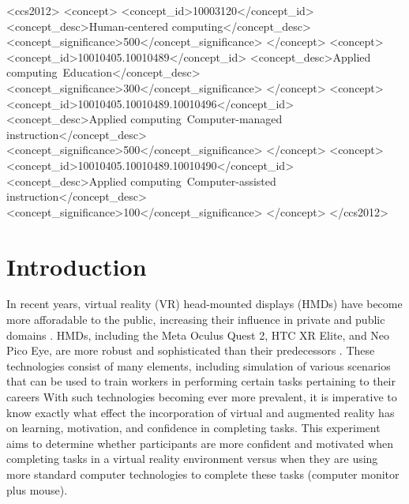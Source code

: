 \documentclass[manuscript,screen,review]{acmart}
\begin{document}
\begin{CCSXML}
<ccs2012>
   <concept>
       <concept_id>10003120</concept_id>
       <concept_desc>Human-centered computing</concept_desc>
       <concept_significance>500</concept_significance>
       </concept>
   <concept>
       <concept_id>10010405.10010489</concept_id>
       <concept_desc>Applied computing~Education</concept_desc>
       <concept_significance>300</concept_significance>
       </concept>
   <concept>
       <concept_id>10010405.10010489.10010496</concept_id>
       <concept_desc>Applied computing~Computer-managed instruction</concept_desc>
       <concept_significance>500</concept_significance>
       </concept>
   <concept>
       <concept_id>10010405.10010489.10010490</concept_id>
       <concept_desc>Applied computing~Computer-assisted instruction</concept_desc>
       <concept_significance>100</concept_significance>
       </concept>
 </ccs2012>
\end{CCSXML}




\maketitle

\section{Introduction}
In recent years, virtual reality (VR) head-mounted displays (HMDs) have become more afforadable to the public, increasing their influence in private and public domains \cite{gugenheimer2019challenges}. HMDs, including the Meta Oculus Quest 2, HTC XR Elite, and Neo Pico Eye, are more robust and sophisticated than their predecessors \cite{mehrfard2019comparative}. These technologies consist of many elements, including simulation of various scenarios that can be used to train workers in performing certain tasks pertaining to their careers \cite{zheng1998virtual} With such technologies becoming ever more prevalent, it is imperative to know exactly what effect the incorporation of virtual and augmented reality has on learning, motivation, and confidence in completing tasks. This experiment aims to determine whether participants are more confident and motivated when completing tasks in a virtual reality environment versus when they are using more standard computer technologies to complete these tasks (computer monitor plus mouse).
\end{document}
